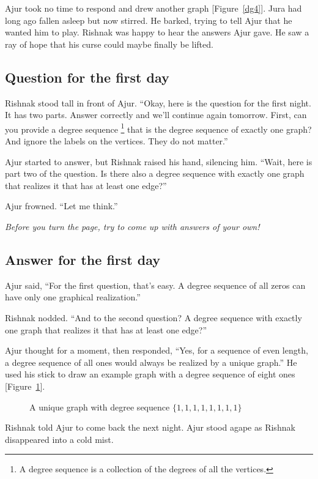 Ajur took no time to respond and drew another graph [Figure~\ref{dg4}].
Jura had long ago fallen asleep but now stirred. He barked, trying to tell Ajur that he wanted him to play. Rishnak was happy to hear the answers Ajur gave. He saw a ray of hope that his curse could maybe finally be lifted.

\subsection*{Question for the first day}
Rishnak stood tall in front of Ajur.  ``Okay, here is the question for the first night.  It has two parts.  Answer correctly and we'll continue again tomorrow. First, can you provide a degree sequence \footnote{A degree sequence is a collection of the degrees of all the vertices.} that is the degree sequence of exactly one graph? And ignore the labels on the vertices. They do not matter.''

Ajur started to answer, but Rishnak raised his hand, silencing him.  ``Wait, here is part two of the question. Is there also a degree sequence with exactly one graph that realizes it that has at least one edge?''

Ajur frowned.  ``Let me think.''

\textit{Before you turn the page, try to come up with answers of your own!}

\newpage
\subsection*{Answer for the first day}
Ajur said, ``For the first question, that's easy.  A degree sequence of all zeros can have only one graphical realization.''

Rishnak nodded. ``And to the second question? A degree sequence with exactly one graph that realizes it that has at least one edge?''

Ajur thought for a moment, then responded, ``Yes, for a sequence of even length, a degree sequence of all ones would always be realized by a unique graph.''
He used his stick to draw an example graph with a degree sequence of eight ones [Figure~\ref{daya1}].

\begin{figure}
\begin{center}
\caption{A unique graph with degree sequence $\{1,1,1,1,1,1,1,1\}$}\label{daya1}
\end{center}
\end{figure}

Rishnak told Ajur to come back the next night. Ajur stood agape as Rishnak disappeared into a cold mist.
